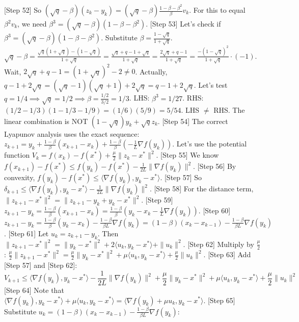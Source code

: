 \documentclass{article}
\begin{document}
[Step 52] So $(\sqrt{q} - \beta)(z_k - y_k) = (\sqrt{q} - \beta)\frac{1-\beta-\beta^2}{\beta}v_k$.
For this to equal $\beta^2 v_k$, we need $\beta^3 = (\sqrt{q} - \beta)(1-\beta-\beta^2)$.
[Step 53] Let's check if $\beta^3 = (\sqrt{q} - \beta)(1-\beta-\beta^2)$.
Substitute $\beta = \frac{1-\sqrt{q}}{1+\sqrt{q}}$.
$\sqrt{q} - \beta = \frac{\sqrt{q}(1+\sqrt{q}) - (1-\sqrt{q})}{1+\sqrt{q}} = \frac{\sqrt{q} + q - 1 + \sqrt{q}}{1+\sqrt{q}} = \frac{2\sqrt{q} + q - 1}{1+\sqrt{q}} = \frac{-(1-\sqrt{q})^2}{1+\sqrt{q}} \cdot (-1)$.
Wait, $2\sqrt{q} + q - 1 = (1+\sqrt{q})^2 - 2 \neq 0$.
Actually, $q - 1 + 2\sqrt{q} = (\sqrt{q}-1)(\sqrt{q}+1) + 2\sqrt{q} = q - 1 + 2\sqrt{q}$.
Let's test $q=1/4 \implies \sqrt{q}=1/2 \implies \beta = \frac{1/2}{3/2} = 1/3$.
LHS: $\beta^3 = 1/27$.
RHS: $(1/2 - 1/3)(1 - 1/3 - 1/9) = (1/6)(5/9) = 5/54$.
LHS $\ne$ RHS. The linear combination is NOT $(1-\sqrt{q})y_k + \sqrt{q}z_k$.
[Step 54] The correct Lyapunov analysis uses the exact sequence:
$z_{k+1} = y_k + \frac{1-\beta}{\beta}(x_{k+1} - x_k) + \frac{1-\beta}{\beta}(-\frac{1}{L}\nabla f(y_k))$.
Let's use the potential function $V_k = f(x_k) - f(x^*) + \frac{\mu}{2}\|z_k - x^*\|^2$.
[Step 55] We know $f(x_{k+1}) - f(x^*) \le f(y_k) - f(x^*) - \frac{1}{2L}\|\nabla f(y_k)\|^2$.
[Step 56] By convexity, $f(y_k) - f(x^*) \le \langle \nabla f(y_k), y_k - x^* \rangle$.
[Step 57] So $\delta_{k+1} \le \langle \nabla f(y_k), y_k - x^* \rangle - \frac{1}{2L}\|\nabla f(y_k)\|^2$.
[Step 58] For the distance term, $\|z_{k+1} - x^*\|^2 = \|z_{k+1} - y_k + y_k - x^*\|^2$.
[Step 59] $z_{k+1} - y_k = \frac{1-\beta}{\beta}(x_{k+1} - x_k) = \frac{1-\beta}{\beta}(y_k - x_k - \frac{1}{L}\nabla f(y_k))$.
[Step 60] $z_{k+1} - y_k = \frac{1-\beta}{\beta}(y_k - x_k) - \frac{1-\beta}{\beta L}\nabla f(y_k) = (1-\beta)(x_k - x_{k-1}) - \frac{1-\beta}{\beta L}\nabla f(y_k)$.
[Step 61] Let $u_k = z_{k+1} - y_k$. Then $\|z_{k+1} - x^*\|^2 = \|y_k - x^*\|^2 + 2\langle u_k, y_k - x^* \rangle + \|u_k\|^2$.
[Step 62] Multiply by $\frac{\mu}{2}$:
$\frac{\mu}{2}\|z_{k+1} - x^*\|^2 = \frac{\mu}{2}\|y_k - x^*\|^2 + \mu\langle u_k, y_k - x^* \rangle + \frac{\mu}{2}\|u_k\|^2$.
[Step 63] Add [Step 57] and [Step 62]:
$$ V_{k+1} \le \langle \nabla f(y_k), y_k - x^* \rangle - \frac{1}{2L}\|\nabla f(y_k)\|^2 + \frac{\mu}{2}\|y_k - x^*\|^2 + \mu\langle u_k, y_k - x^* \rangle + \frac{\mu}{2}\|u_k\|^2 $$
[Step 64] Note that $\langle \nabla f(y_k), y_k - x^* \rangle + \mu\langle u_k, y_k - x^* \rangle = \langle \nabla f(y_k) + \mu u_k, y_k - x^* \rangle$.
[Step 65] Substitute $u_k = (1-\beta)(x_k - x_{k-1}) - \frac{1-\beta}{\beta L}\nabla f(y_k)$:
\end{document}
